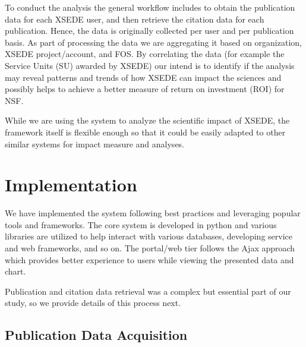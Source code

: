 \documentclass{sig-alternate}
\begin{document}
To conduct the analysis the general workflow includes to obtain the
publication data for each XSEDE user, and then retrieve the citation
data for each publication. Hence, the data is originally collected per
user and per publication basis. As part of processing the data we are
aggregating it based on organization, XSEDE project/account, and
FOS. By correlating the data (for example the Service Units (SU) awarded
by XSEDE) our intend is to identify if the analysis may reveal
patterns and trends of how XSEDE can impact the sciences and possibly
helps to achieve a better measure of return on investment (ROI) for
NSF.
 
While we are using the system to analyze the scientific impact of
XSEDE, the framework itself is flexible enough so that it could be easily
adapted to other similar systems for impact measure and analyses.
 
\section{Implementation} \label{S:implementation}
 
We have implemented the system following best practices and leveraging
popular tools and frameworks. The core system is developed in python
and various libraries are utilized to help interact with various
databases, developing service and web frameworks, and so on. The
portal/web tier follows the Ajax approach which provides better
experience to users while viewing the presented data and chart.

Publication and citation data retrieval was a complex but essential
part of our study, so we provide details of this process next.
  
\subsection{Publication Data Acquisition} 
 
\end{document}

